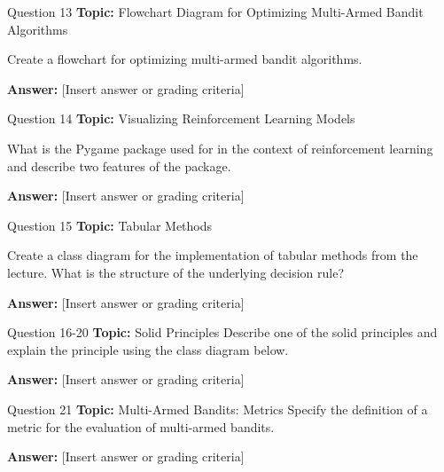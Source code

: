 \begin{frame}{Question 13}
    \textbf{Topic:} Flowchart Diagram for Optimizing Multi-Armed Bandit Algorithms
    \vspace{10pt}

    Create a flowchart for optimizing multi-armed bandit algorithms. 
    \vspace{20pt}

    \textbf{Answer:} [Insert answer or grading criteria]
\end{frame}

\begin{frame}{Question 14}
    \textbf{Topic:} Visualizing Reinforcement Learning Models
    \vspace{10pt}

    What is the Pygame package used for in the context of reinforcement learning and describe two features of the package. 
    \vspace{20pt}

    \textbf{Answer:} [Insert answer or grading criteria]
\end{frame}

\begin{frame}{Question 15}
    \textbf{Topic:} Tabular Methods
    \vspace{10pt}

    Create a class diagram for the implementation of tabular methods from the lecture. What is the structure of the underlying decision rule? 
    \vspace{20pt}

    \textbf{Answer:} [Insert answer or grading criteria]
\end{frame}

\begin{frame}{Question 16-20}
    \textbf{Topic:} Solid Principles
    \vspace{10pt}
    Describe one of the solid principles and explain the principle using the class diagram below. 
    \vspace{20pt}

    \textbf{Answer:} [Insert answer or grading criteria]
\end{frame}

\begin{frame}{Question 21}
    \textbf{Topic:} Multi-Armed Bandits: Metrics
    \vspace{10pt}
    Specify the definition of a metric for the evaluation of multi-armed bandits.
    \vspace{20pt}

    \textbf{Answer:} [Insert answer or grading criteria]
\end{frame}

